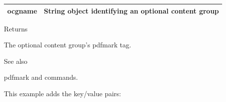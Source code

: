 \documentclass[letterpaper,12pt,english,openany,oneside]{sphinxmanual}
\begin{document}
\begin{sphinxVerbatim}[commandchars=\\\{\}]
 
           
\end{sphinxVerbatim}
\label{\detokenize{pdfmark_OC_Interface:syntax-3}}

\begin{sphinxVerbatim}[commandchars=\\\{\}]
\end{sphinxVerbatim}
\label{\detokenize{pdfmark_OC_Interface:parameters-2}}


\begin{savenotes}\sphinxattablestart
\centering
{}\label{\detokenize{pdfmark_OC_Interface:section-2}}\nobreak
\begin{tabulary}{\linewidth}[t]{|T|T|}
\hline

ocgname
&
String object identifying an optional content group
\\
\hline
\end{tabulary}
\par
\sphinxattableend\end{savenotes}

Returns

The optional content group’s  pdfmark tag.

\label{\detokenize{pdfmark_OC_Interface:see-also-2}}
See also

pdfmark  and  commands.

\label{\detokenize{pdfmark_OC_Interface:example-1}}

\begin{sphinxVerbatim}[commandchars=\\\{\}]
\PYG{p}{[}        
\end{sphinxVerbatim}

This example adds the key/value pairs:
\end{document}
